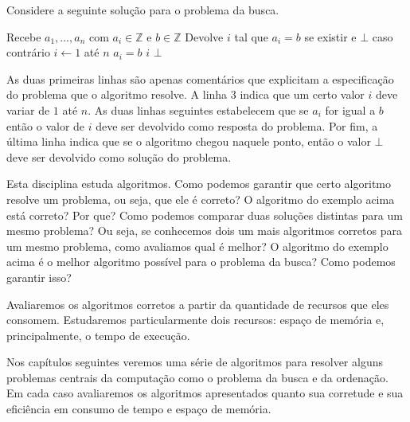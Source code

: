 \begin{example}
  Considere a seguinte solução para o problema da busca.

\begin{codebox}
\li \Comment Recebe $a_1, \dots, a_n$ com $a_i \in \mathbb{Z}$ e $b \in \mathbb{Z}$
\li \Comment Devolve $i$ tal que $a_i = b$ se existir e $\bot$ caso contrário
\li \For $i \gets 1$ até $n$
\li \Do \If $a_i = b$
\li     \Then \Return $i$
        \End
    \End
\li \Return $\bot$
\End
\end{codebox}


As duas primeiras linhas são apenas comentários que explicitam a especificação do problema que o algoritmo resolve.
A linha 3 indica que um certo valor $i$ deve variar de $1$ até $n$.
As duas linhas seguintes estabelecem que se $a_i$ for igual a $b$ então o valor de $i$ deve ser devolvido como resposta do problema.
Por fim, a última linha indica que se o algoritmo chegou naquele ponto, então o valor $\bot$ deve ser devolvido como solução do problema.

\end{example}

Esta disciplina estuda algoritmos.
Como podemos garantir que certo algoritmo resolve um problema, ou seja, que ele é correto?
O algoritmo do exemplo acima está correto?
Por que?
Como podemos comparar duas soluções distintas para um mesmo problema?
Ou seja, se conhecemos dois um mais algoritmos corretos para um mesmo problema, como avaliamos qual é melhor?
O algoritmo do exemplo acima é o melhor algoritmo possível para o problema da busca?
Como podemos garantir isso?

Avaliaremos os algoritmos corretos a partir da quantidade de recursos que eles consomem.
Estudaremos particularmente dois recursos: espaço de memória e, principalmente, o tempo de execução.

Nos capítulos seguintes veremos uma série de algoritmos para resolver alguns problemas centrais da computação como o problema da busca e da ordenação.
Em cada caso avaliaremos os algoritmos apresentados quanto sua corretude e sua eficiência em consumo de tempo e espaço de memória.

